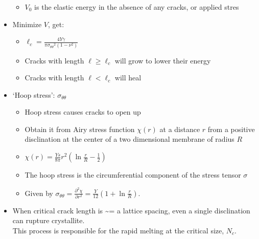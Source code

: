 \documentclass[11pt]{article}
\begin{document}
\begin{itemize}
\begin{itemize}
\item $V_0$ is the elastic energy in the absence of any cracks, or applied stres\\
\label{sec-3-1-5-2-10}%
\end{itemize} %

\item Minimize $V$, get:
\label{sec-3-1-5-3}%
\begin{itemize}

\item $\ell_c = \frac{ 4 Y \gamma}{\pi {\sigma_{\theta \theta}}^2 (1-\nu^2)}$\\
\label{sec-3-1-5-3-1}%
\item Cracks with length $\ell \ge \ell_c$ will grow to lower their energy\\
\label{sec-3-1-5-3-2}%
\item Cracks with length $\ell < \ell_c$ will heal\\
\label{sec-3-1-5-3-3}%
\end{itemize} %

\item `Hoop stress': $\sigma_{\theta \theta}$
\label{sec-3-1-5-4}%
\begin{itemize}

\item Hoop stress causes cracks to open up\\
\label{sec-3-1-5-4-1}%
\item Obtain it from Airy stress function $\chi(r)$  \cite{seung} at a distance $r$ from a positive disclination at the center of a two dimensional membrane of radius $R$\\
\label{sec-3-1-5-4-2}%
\item $\chi(r) =  \frac{Y s}{8 \pi} r^2   \left ( \ln \frac{r}{R} - \frac{1}{2} \right )$\\
\label{sec-3-1-5-4-3}%
\item The hoop stress is the circumferential component of the stress tensor $\sigma$\\
\label{sec-3-1-5-4-4}%
\item Given by $\sigma_{\theta \theta}= \frac{\partial^2 \chi}{\partial r^2}=  \frac{Y}{12} \left(1 + \ln \frac{r}{R} \right )$.\\
\label{sec-3-1-5-4-5}%
\end{itemize} %

\item When critical crack length is \~{}= a lattice spacing, even a single disclination can rupture crystallite.\\
\label{sec-3-1-5-5}%
This process is responsible for the rapid melting at the critical size, $N_c$.


\end{itemize}
\end{document}
